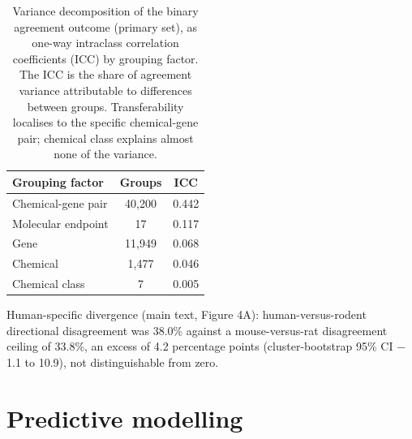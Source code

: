 \documentclass[11pt]{elsarticle}
\begin{document}
\begin{table}[H]
\small
\centering
\caption{Variance decomposition of the binary agreement outcome (primary set),
as one-way intraclass correlation coefficients (ICC) by grouping factor. The ICC
is the share of agreement variance attributable to differences between groups.
Transferability localises to the specific chemical-gene pair; chemical class
explains almost none of the variance.}
\label{tab:s5}
\begin{tabular}{lcc}
\toprule
Grouping factor & Groups & ICC \\
\midrule
Chemical-gene pair & 40{,}200 & 0.442 \\
Molecular endpoint & 17 & 0.117 \\
Gene & 11{,}949 & 0.068 \\
Chemical & 1{,}477 & 0.046 \\
Chemical class & 7 & 0.005 \\
\bottomrule
\end{tabular}
\end{table}

\noindent Human-specific divergence (main text, Figure 4A): human-versus-rodent
directional disagreement was 38.0\% against a mouse-versus-rat disagreement
ceiling of 33.8\%, an excess of 4.2 percentage points (cluster-bootstrap 95\% CI
$-$1.1 to 10.9), not distinguishable from zero.

\clearpage
\section{Predictive modelling}
\end{document}
